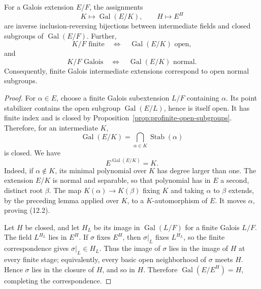 \begin{theorem}\label{thm:infinite-galois}
For a Galois extension \(E/F\), the assignments
\[
K\longmapsto\operatorname{Gal}(E/K),
\qquad
H\longmapsto E^H
\]
are inverse inclusion-reversing bijections between intermediate fields and
closed subgroups of \(\operatorname{Gal}(E/F)\).  Further,
\[
K/F\text{ finite}\quad\Longleftrightarrow\quad
\operatorname{Gal}(E/K)\text{ open},
\]
and
\[
K/F\text{ Galois}\quad\Longleftrightarrow\quad
\operatorname{Gal}(E/K)\text{ normal}.
\]
Consequently, finite Galois intermediate extensions correspond to open normal
subgroups.
\end{theorem}
\begin{proof}
For \(\alpha\in E\), choose a finite Galois subextension \(L/F\) containing
\(\alpha\).  Its point stabilizer contains the open subgroup
\(\operatorname{Gal}(E/L)\), hence is itself open.  It has finite index and
is closed by Proposition~\ref{prop:profinite-open-subgroups}.  Therefore, for
an intermediate \(K\),
\[
\operatorname{Gal}(E/K)=\bigcap_{\alpha\in K}\operatorname{Stab}(\alpha)
\]
is closed.  We have
\begin{equation}\label{eq:infinite-galois-fixed-field}
E^{\operatorname{Gal}(E/K)}=K.
\end{equation}
Indeed, if \(\alpha\notin K\), its minimal polynomial over \(K\) has degree
larger than one.  The extension \(E/K\) is normal and separable, so that
polynomial has in \(E\) a second, distinct root \(\beta\).  The map
\(K(\alpha)\to K(\beta)\) fixing \(K\) and taking \(\alpha\) to \(\beta\)
extends, by the preceding lemma applied over \(K\), to a \(K\)-automorphism of
\(E\).  It moves \(\alpha\), proving (12.2).

Let \(H\) be closed, and let \(H_L\) be its image in
\(\operatorname{Gal}(L/F)\) for a finite Galois \(L/F\).  The field
\(L^{H_L}\) lies in \(E^H\).  If \(\sigma\) fixes \(E^H\), then
\(\sigma|_L\) fixes \(L^{H_L}\), so the finite correspondence gives
\(\sigma|_L\in H_L\).  Thus the image of \(\sigma\) lies in the image of
\(H\) at every finite stage; equivalently, every basic open neighborhood of
\(\sigma\) meets \(H\).  Hence \(\sigma\) lies in the closure of \(H\), and so
in \(H\).  Therefore \(\operatorname{Gal}(E/E^H)=H\), completing the
correspondence.


\end{proof}

